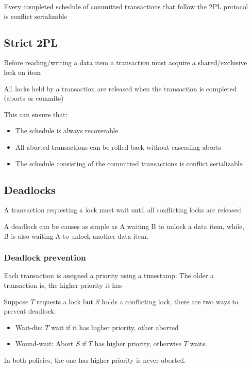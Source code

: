 \documentclass{article}
\begin{document}
Every completed schedule of committed transactions that follow the 2PL protocol is conflict serializable

\subsection*{Strict 2PL}

Before reading/writing a data item a transaction must acquire a shared/exclusive lock on item

All locks held by a transaction are released when the transaction is completed (aborts or commits)

This can ensure that:
\begin{itemize}
  \item The schedule is always recoverable
  \item All aborted transactions can be rolled back without cascading aborts
  \item The schedule consisting of the committed transactions is conflict serializable
\end{itemize}

\subsection*{Deadlocks}
A transaction requesting a lock must wait until all conflicting locks are released

A deadlock can be causes as simple as A waiting B to unlock a data item, while, B is also waiting A to unlock another data item.

\subsubsection*{Deadlock prevention}
Each transaction is assigned a priority using a timestamp: The older a transaction is, the higher priority it has

Suppose $T$ requests a lock but $S$ holds a conflicting lock, there are two ways to prevent deadlock:
\begin{itemize}
  \item Wait-die: $T$ wait if it has higher priority, other aborted
  \item Wound-wait: Abort $S$ if $T$ has higher priority, otherwise $T$ waits.
\end{itemize}
In both policies, the one has higher priority is never aborted.
\end{document}
